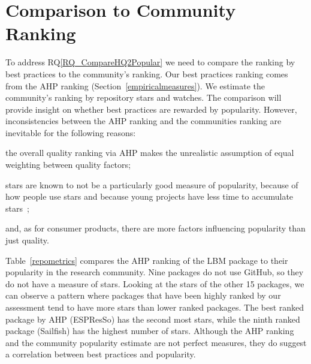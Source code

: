 \documentclass[runningheads]{llncs}
\newcommand{\rqref}[1]{RQ\ref{#1}}
\begin{document}
\section{Comparison to Community Ranking} \label{repmetrics}

To address \rqref{RQ_CompareHQ2Popular} we need to compare the ranking by best
practices to the community's ranking.  Our best practices ranking comes from the
AHP ranking (Section~\ref{empiricalmeasures}).  We estimate the community's
ranking by repository stars and watches.  The comparison will provide insight on
whether best practices are rewarded by popularity.  However, inconsistencies
between the AHP ranking and the communities ranking are inevitable for the
following reasons: 
\begin{inparaenum}[i)]
	\item the overall quality ranking via AHP makes the unrealistic assumption
	of equal weighting between quality factors;
	\item stars are known to not be a particularly good measure of popularity,
	because of how people use stars and because young projects have less time to
	accumulate stars~\cite{Szulik2017}; 
	\item and, as for consumer products, there are more factors influencing
	popularity than just quality.
\end{inparaenum}

Table~\ref{repometrics} compares the AHP ranking of the LBM package to their
popularity in the research community.  Nine packages do not use GitHub, so they
do not have a measure of stars. Looking at the stars of the other 15 packages,
we can observe a pattern where packages that have been highly ranked by our
assessment tend to have more stars than lower ranked packages. The best ranked
package by AHP (ESPResSo) has the second most stars, while the ninth ranked
package (Sailfish) has the highest number of stars. Although the AHP ranking and
the community popularity estimate are not perfect measures, they do suggest a
correlation between best practices and popularity.
\end{document}
